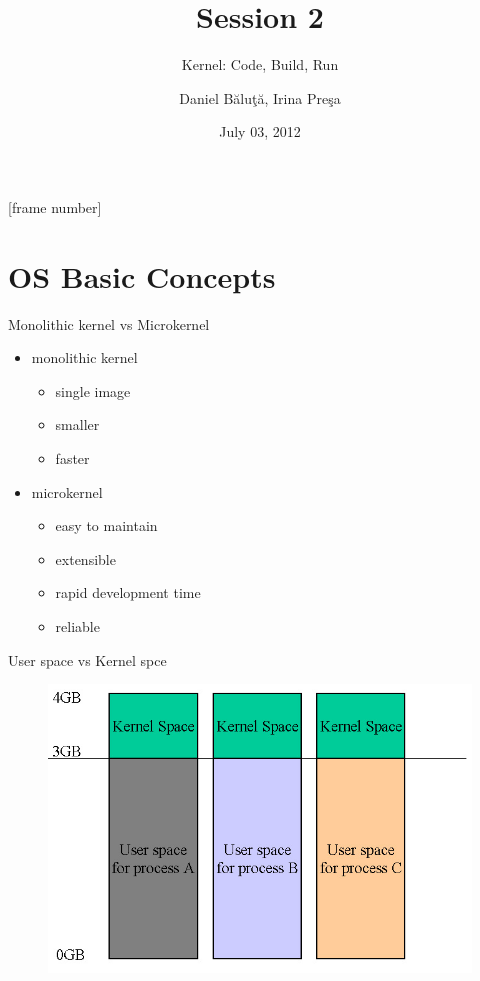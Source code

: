 \documentclass{workshop}
\title[Session 2]{Session 2}
\subtitle{Kernel: Code, Build, Run}
\author{Daniel Băluţă, Irina Preşa}
\date{July 03, 2012}
\begin{document}
[frame number]

\frame{\titlepage}

\section{OS Basic Concepts}

\begin{frame}{Monolithic kernel vs Microkernel}
	\begin{itemize}
	\item monolithic kernel
    	\begin{itemize}
	\item single image
	\item smaller
	\item faster
	\end{itemize}
	\item microkernel
	\begin{itemize}
	\item easy to maintain
	\item extensible
	\item rapid development time
	\item reliable
	\end{itemize}
	\end{itemize}
\end{frame}

\begin{frame}{User space vs Kernel spce}

\begin{figure}
  \includegraphics[scale=0.4]{img/user-kernel-space.jpg}
\end{figure}

\end{frame}
\end{document}
